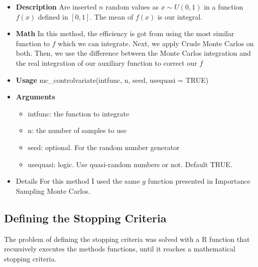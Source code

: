 \documentclass{article}
\begin{document}
\begin{itemize}
    \item \textbf{Description}\newline
    Are inserted $n$ random values as $x \sim U(0, 1)$ in a function $f(x)$ defined in $[0,1]$. The mean of $f(x)$ is our integral.
    
    \item \textbf{Math}\newline
    In this method, the efficiency is got from using the most similar function to $f$ which we can integrate. Next, we apply Crude Monte Carlos on both. Then, we use the difference between the Monte Carlos integration and the real integration of our auxiliary function to correct our $f$
    
    \item \textbf{Usage}\newline
    mc\_controlvariate(intfunc, n, seed, usequasi = TRUE)
    
    \item \textbf{Arguments}
    
    \begin{itemize}
        \item intfunc:   the function to integrate
        \item n:         the number of samples to use
        \item seed:      optional. For the random number generator
        \item usequasi:  logic. Use quasi-random numbers or not. Default TRUE.
    \end{itemize}
    
    \item Details
    For this method I used the same $g$ function presented in Importance Sampling Monte Carlos.
    
\end{itemize}

\subsection{Defining the Stopping Criteria}
The problem of defining the stopping criteria was solved with a R function that recursively executes the methods functions, until it reaches a mathematical stopping criteria.
\end{document}
